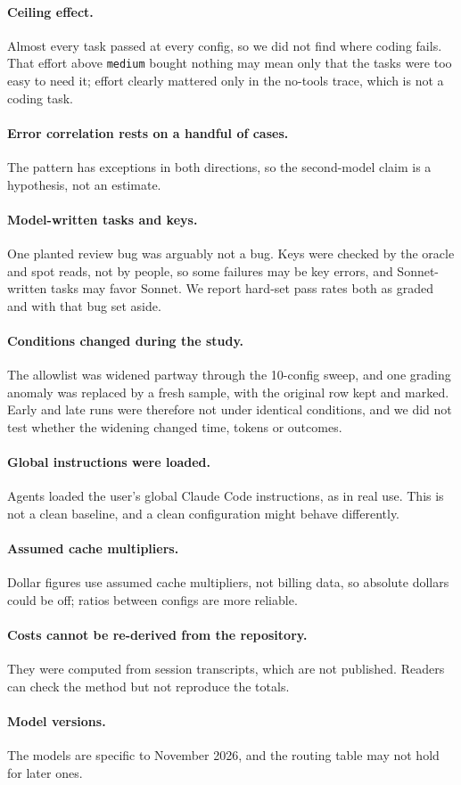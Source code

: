 \paragraph{Ceiling effect.} Almost every task passed at every config, so we did not find where coding fails. That effort above \texttt{medium} bought nothing may mean only that the tasks were too easy to need it; effort clearly mattered only in the no-tools trace, which is not a coding task.

\paragraph{Error correlation rests on a handful of cases.} The pattern has exceptions in both directions, so the second-model claim is a hypothesis, not an estimate.

\paragraph{Model-written tasks and keys.} One planted review bug was arguably not a bug. Keys were checked by the oracle and spot reads, not by people, so some failures may be key errors, and Sonnet-written tasks may favor Sonnet. We report hard-set pass rates both as graded and with that bug set aside.

\paragraph{Conditions changed during the study.} The allowlist was widened partway through the 10-config sweep, and one grading anomaly was replaced by a fresh sample, with the original row kept and marked. Early and late runs were therefore not under identical conditions, and we did not test whether the widening changed time, tokens or outcomes.

\paragraph{Global instructions were loaded.} Agents loaded the user's global Claude Code instructions, as in real use. This is not a clean baseline, and a clean configuration might behave differently.

\paragraph{Assumed cache multipliers.} Dollar figures use assumed cache multipliers, not billing data, so absolute dollars could be off; ratios between configs are more reliable.

\paragraph{Costs cannot be re-derived from the repository.} They were computed from session transcripts, which are not published. Readers can check the method but not reproduce the totals.

\paragraph{Model versions.} The models are specific to November 2026, and the routing table may not hold for later ones.

